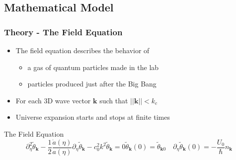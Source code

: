 \documentclass[aspectratio=169]{beamer}
\begin{document}
\subsection{Mathematical Model}
\begin{frame}
    \frametitle{Theory - The Field Equation}
    
    \begin{itemize}
        \item The field equation describes the behavior of

            \begin{itemize}
                \item a gas of quantum particles made in the lab
                \item particles produced just after the Big Bang
            \end{itemize}

        \item For each 3D wave vector $\mathbf{k}$ such that $||\mathbf{k}|| < k_c$ %
        \item Universe expansion starts and stops at finite times %
    \end{itemize}
    

    \begin{exampleblock}{\centering The Field Equation}
        \begin{subequations}
            \begin{equation}
                \partial_\eta^2 \widetilde{\theta}_\mathbf{k} - \frac{1}{2} \frac{\dot{a}(\eta)}{a(\eta)} \partial_\eta \widetilde{\theta}_\mathbf{k} 
            - c_0^2 k^2 \widetilde{\theta}_\mathbf{k} = 0
            \end{equation}
            \begin{equation}
                \widetilde{\theta}_\mathbf{k}(0) = \widetilde{\theta}_{\mathbf{k}0} \quad \partial_\eta \widetilde{\theta}_\mathbf{k}(0) = -\frac{U_0}{\hbar} n_\mathbf{k}
            \end{equation}
        \end{subequations}
    \end{exampleblock}

\end{frame}
\end{document}
